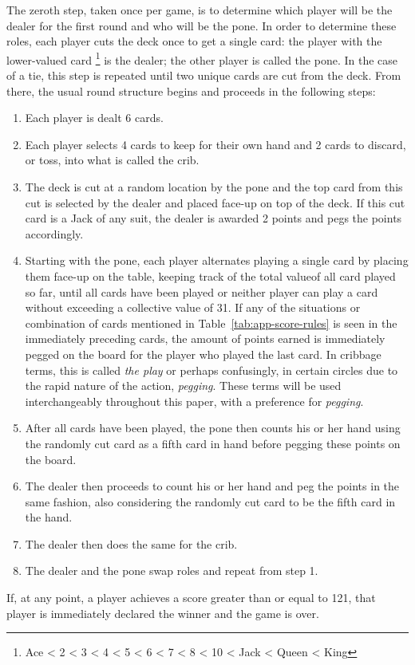 The zeroth step, taken once per game, is to determine which player will be the
dealer for the first round and who will be the pone.
%
%
In order to determine these roles,
each player cuts the deck once to get a single card:
the player with the lower-valued card%
\footnote{Ace < 2 < 3 < 4 < 5 < 6 < 7 < 8 < 10 < Jack < Queen < King}
is the dealer;
the other player is called the pone.
In the case of a tie, this step is repeated until two unique cards are
cut from the deck.
%
From there, the usual round structure begins and proceeds in the following
steps:
%
\begin{enumerate}
%
\item Each player is dealt 6 cards.
%
\item Each player selects 4 cards to keep for their own hand and 2 cards to
	discard, or toss, into what is called the crib.
%
\item The deck is cut at a random location by the pone
	and the top card from this cut is selected by the dealer and placed
	face-up on top of the deck.
	If this cut card is a Jack of any suit,
	the dealer is awarded 2 points and pegs the points accordingly.
%
\item Starting with the pone, each player alternates playing a single card
	by placing them face-up on the table,
	keeping track of the total value\footnotemark of all card played so far,
	until all cards have been played
	or neither player can play a card without exceeding a collective value of
	31.
	If any of the situations or combination of cards mentioned in
	Table~\ref{tab:app-score-rules} is seen in the immediately preceding cards,
	the amount of points earned is immediately pegged on the board for the
	player who played the last card.
	In cribbage terms, this is called \textit{the play}
	or perhaps confusingly,
	in certain circles due to the rapid nature of the
	action, \textit{pegging}.
	These terms will be used interchangeably throughout this paper,
	with a preference for \textit{pegging}.
%
\item After all cards have been played,
	the pone then counts his or her hand using the randomly cut card as a
	fifth card in hand before pegging these points on the board.
%
\item The dealer then proceeds to count his or her hand and peg the points
	in the same fashion, also considering the randomly cut card to be the
	fifth card in the hand.
%
\item The dealer then does the same for the crib.
%
\item The dealer and the pone swap roles and repeat from step 1.
%
\end{enumerate}
%
If, at any point, a player achieves a score greater than or equal to 121,
that player is immediately declared the winner and the game is over.



